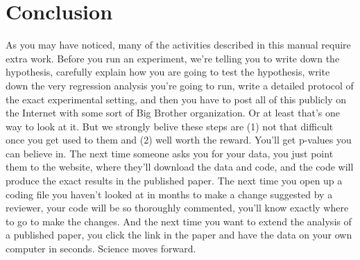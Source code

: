 \documentclass[12pt] {article}
\begin{document}
\section{Conclusion}\label{conclusion}

As you may have noticed, many of the activities described in this manual
require extra work. Before you run an experiment, we're telling you to
write down the hypothesis, carefully explain how you are going to test
the hypothesis, write down the very regression analysis you're going to
run, write a detailed protocol of the exact experimental setting, and
then you have to post all of this publicly on the Internet with some
sort of Big Brother organization. Or at least that's one way to look at
it. But we strongly belive these steps are (1) not that difficult once
you get used to them and (2) well worth the reward. You'll get p-values
you can believe in. The next time someone asks you for your data, you
just point them to the website, where they'll download the data and
code, and the code will produce the exact results in the published
paper. The next time you open up a coding file you haven't looked at in
months to make a change suggested by a reviewer, your code will be so
thoroughly commented, you'll know exactly where to go to make the
changes. And the next time you want to extend the analysis of a
published paper, you click the link in the paper and have the data on
your own computer in seconds. Science moves forward.


\end{document}
